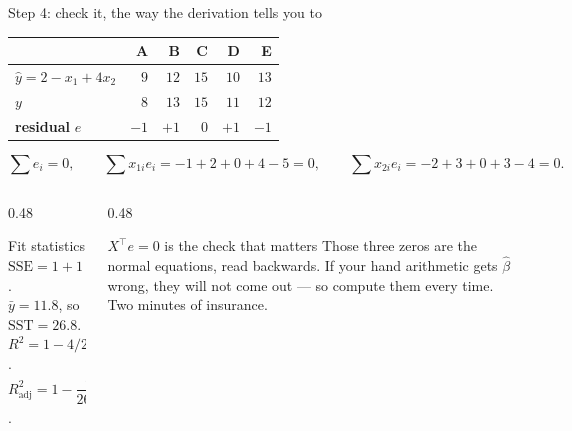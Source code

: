 \documentclass[aspectratio=169]{beamer}
\newcommand{\Xt}{X^{\!\top}}
\begin{document}
\begin{frame}[shrink=8]{Step 4: check it, the way the derivation tells you to}
  \begin{center}\small
  \begin{tabular}{@{}lrrrrr@{}}
    \toprule
    & A & B & C & D & E\\
    \midrule
    $\hat y = 2 - x_1 + 4x_2$ & $9$ & $12$ & $15$ & $10$ & $13$\\
    $y$ & $8$ & $13$ & $15$ & $11$ & $12$\\
    \textbf{residual} $e$ & $-1$ & $+1$ & $0$ & $+1$ & $-1$\\
    \bottomrule
  \end{tabular}
  \end{center}
  \vspace{0.2em}
  \[
    \textstyle\sum e_i = 0,\qquad
    \sum x_{1i}e_i = -1+2+0+4-5 = 0,\qquad
    \sum x_{2i}e_i = -2+3+0+3-4 = 0 .
  \]
  \begin{columns}[T]
    \begin{column}{0.48\textwidth}
      \begin{block}{Fit statistics}
        \small $\mathrm{SSE} = 1+1+0+1+1 = 4$. \\
        $\bar y = 11.8$, so
        $\mathrm{SST} = 26.8$.\\
        $R^2 = 1 - 4/26.8 = \mathbf{0.8507}$.\\
        $R^2_{\text{adj}} = 1 - \dfrac{4/2}{26.8/4} = \mathbf{0.7015}$.
      \end{block}
    \end{column}
    \begin{column}{0.48\textwidth}
      \begin{alertblock}{$\Xt e = 0$ is the check that matters}
        \small Those three zeros are the normal equations, read backwards.
        If your hand arithmetic gets $\hat\beta$ wrong, they will not come
        out --- so compute them every time. Two minutes of insurance.
      \end{alertblock}
    \end{column}
  \end{columns}
\end{frame}
\end{document}
